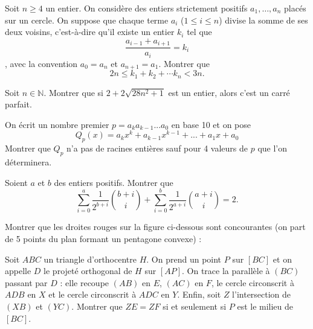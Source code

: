 \begin{exo}{} 
Soit $n \geq 4$ un entier. On considère des entiers strictement positifs $a_{1}, \ldots,a_{n}$ placés sur un cercle. On suppose que chaque terme $a_{i}$ ($1 \leq i \leq n$) divise la somme de ses deux voisins, c'est-à-dire qu'il existe un entier $k_{i}$ tel que 
\[ \frac{a_{i-1}+a_{i+1}}{a_i}= k_i \],
avec la convention $a_{0}=a_{n}$ et $a_{n+1}=a_{1}$. Montrer que
$$2n \leq k_{1}+ k_{2}+ \cdots k_{n} <3n.$$
 \end{exo}

\begin{exo}{}
Soit $n \in \mathbb{N}$. Montrer que si $2+2\sqrt{28n^2+1}$ est un entier, alors c'est un carré parfait.
\end{exo}

\begin{exo}{}
On écrit un nombre premier $p=a_ka_{k-1}...a_0$ en base 10 et on pose
\[Q_p(x)=a_kx^k+a_{k-1}x^{k-1}+...+a_1x+a_0\]
Montrer que $Q_p$ n'a pas de racines entières sauf pour 4 valeurs de $p$ que l'on déterminera.
\end{exo}

%
\begin{exo}{}
Soient $a$ et $b$ des entiers positifs. Montrer que 
$$\displaystyle \sum_{i=0}^{a} \frac{1}{2^{b+i}} \binom{b+i}{i} + \displaystyle\sum_{i=0}^{b} \frac{1}{2^{a+i}} \binom{a+i}{i} = 2.$$
\end{exo}




\begin{exo}{}
Montrer que les droites rouges sur la figure ci-dessous sont concourantes (on part de 5 points du plan formant un pentagone convexe) :

\bigskip

\end{exo}

\begin{exo}{}
Soit $ABC$ un triangle d'orthocentre $H$. On prend un point $P$ sur $[BC]$ et on appelle $D$ le projeté orthogonal de $H$ sur $[AP]$. On trace la parallèle à $(BC)$ passant par $D$ : elle recoupe $(AB)$ en $E$, $(AC)$ en $F$, le cercle circonscrit à $ADB$ en $X$ et le cercle circonscrit à $ADC$ en $Y$. Enfin, soit $Z$ l'intersection de $(XB)$ et $(YC)$. Montrer que $ZE=ZF$ si et seulement si $P$ est le milieu de $[BC]$.
\end{exo}


